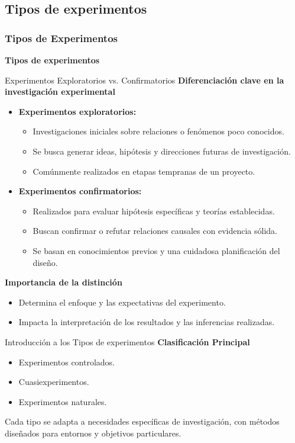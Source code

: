 ﻿\documentclass{beamer}
\begin{document}
\subsection{Tipos de experimentos}
\begin{frame}
    \frametitle{Tipos de Experimentos}
    \centering
    \textbf{\Large Tipos de experimentos}
    \vspace{0.5cm}
\end{frame}

\begin{frame}{Experimentos Exploratorios vs. Confirmatorios}
\textbf{Diferenciación clave en la investigación experimental}
\begin{itemize}
    \item \textbf{Experimentos exploratorios:}
    \begin{itemize}
        \item Investigaciones iniciales sobre relaciones o fenómenos poco conocidos.
        \item Se busca generar ideas, hipótesis y direcciones futuras de investigación.
        \item Comúnmente realizados en etapas tempranas de un proyecto.
    \end{itemize}
    \item \textbf{Experimentos confirmatorios:}
    \begin{itemize}
        \item Realizados para evaluar hipótesis específicas y teorías establecidas.
        \item Buscan confirmar o refutar relaciones causales con evidencia sólida.
        \item Se basan en conocimientos previos y una cuidadosa planificación del diseño.
    \end{itemize}
\end{itemize}

\textbf{Importancia de la distinción}
\begin{itemize}
    \item Determina el enfoque y las expectativas del experimento.
    \item Impacta la interpretación de los resultados y las inferencias realizadas.
\end{itemize}
\end{frame}


\begin{frame}{Introducción a los Tipos de experimentos}
    \textbf{Clasificación Principal}
    \begin{itemize}
        \item Experimentos controlados.
        \item Cuasiexperimentos.
        \item Experimentos naturales.
    \end{itemize}
    Cada tipo se adapta a necesidades específicas de investigación, con métodos diseñados para entornos y objetivos particulares.
\end{frame}
\end{document}
